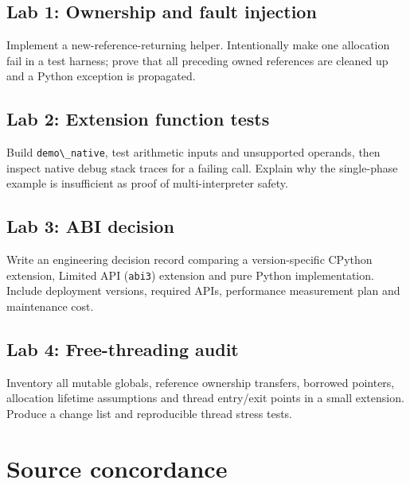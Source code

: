 \documentclass[
  11pt,
]{report}
\newcommand{\passthrough}[1]{#1}
\begin{document}
\section{Lab 1: Ownership and fault
injection}\label{lab-1-ownership-and-fault-injection}

Implement a new-reference-returning helper. Intentionally make one
allocation fail in a test harness; prove that all preceding owned
references are cleaned up and a Python exception is propagated.

\section{Lab 2: Extension function
tests}\label{lab-2-extension-function-tests}

Build \passthrough{\lstinline!demo\_native!}, test arithmetic inputs and
unsupported operands, then inspect native debug stack traces for a
failing call. Explain why the single-phase example is insufficient as
proof of multi-interpreter safety.

\section{Lab 3: ABI decision}\label{lab-3-abi-decision}

Write an engineering decision record comparing a version-specific
CPython extension, Limited API (\passthrough{\lstinline!abi3!})
extension and pure Python implementation. Include deployment versions,
required APIs, performance measurement plan and maintenance cost.

\section{Lab 4: Free-threading audit}\label{lab-4-free-threading-audit}

Inventory all mutable globals, reference ownership transfers, borrowed
pointers, allocation lifetime assumptions and thread entry/exit points
in a small extension. Produce a change list and reproducible thread
stress tests.

\chapter{Source concordance}\label{source-concordance}
\end{document}
